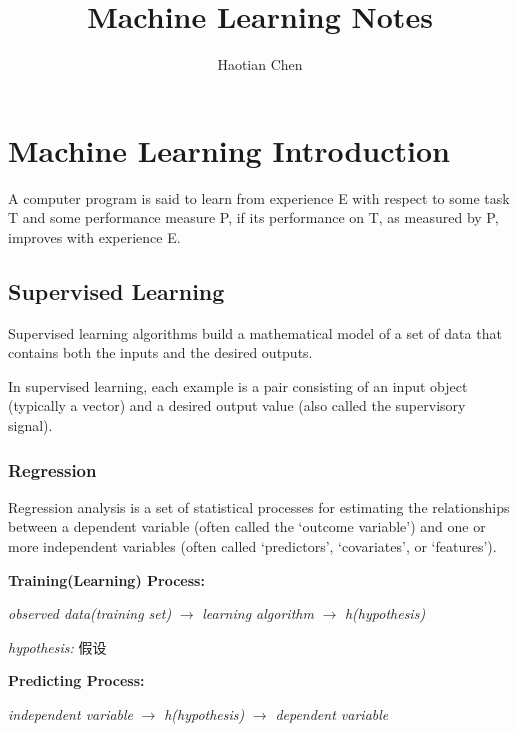 \documentclass{article}
\title{Machine Learning Notes}
\author{Haotian Chen}
\date{}
\begin{document}
\maketitle

\clearpage

\tableofcontents{}

\clearpage

\section{Machine Learning Introduction}

A computer program is said to learn
from experience E with respect to some task T
and some performance measure P, if its
performance on T, as measured by P, improves
with experience E. 

\subsection{Supervised Learning}

Supervised learning algorithms build a mathematical model 
of a set of data that contains both the inputs and the desired 
outputs.

\bigskip

\noindent In supervised learning, each example is a 
pair consisting of an input object (typically a vector) 
and a desired output value (also called the supervisory signal).

\subsubsection{Regression}

Regression analysis is a set of statistical processes 
for estimating the relationships between a dependent 
variable (often called the `outcome variable') and one 
or more independent variables (often called `predictors', 
`covariates', or `features').

\bigskip

\noindent \textbf{Training(Learning) Process:}

\noindent \textit{observed data(training set)} $\rightarrow$ \textit{learning algorithm} $\rightarrow$ \textit{h(hypothesis)}

\noindent \textit{hypothesis:} 假设

\bigskip

\noindent \textbf{Predicting Process:}

\noindent \textit{independent variable} $\rightarrow$ \textit{h(hypothesis)} $\rightarrow$ \textit{dependent variable}
\end{document}
